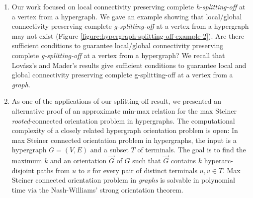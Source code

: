 \documentclass{article}
\newcommand{\knote}[1]{{\color{red}[{\tiny Karthik: \bf #1}]\marginpar{\color{red}*}}}
\begin{document}
\begin{enumerate}
    \item Our work focused on local connectivity preserving complete \emph{h-splitting-off} at a vertex from a hypergraph. We gave an example showing that local/global connectivity preserving complete \emph{g-splitting-off} at a vertex from a hypergraph may not exist (Figure \ref{figure:hypergraph-splitting-off-example-2}). 
    Are there sufficient conditions to guarantee local/global connectivity preserving complete \emph{g-splitting-off} at a vertex from a hypergraph? We recall that Lov\'{a}sz's \cite{Lov74, Lovasz-problems-book} and Mader's \cite{Mad78} results give sufficient conditions to guarantee local and global connectivity preserving complete g-splitting-off at a vertex from a \emph{graph}. 

    \item As one of the applications of our splitting-off result, we presented an alternative proof of an approximate min-max relation for the max Steiner \emph{rooted}-connected orientation problem in hypergraphs. The computational complexity of a closely related hypergraph orientation problem is open: In max Steiner connected orientation problem in hypergraphs, the input is a hypergraph $G=(V, E)$ and a subset $T$ of terminals. The goal is to find the maximum $k$ and an orientation $\overrightarrow{G}$ of $G$ such that $\overrightarrow{G}$ contains $k$ hyperarc-disjoint paths from $u$ to $v$ for every pair of distinct terminals $u, v\in T$. Max Steiner connected orientation problem in \emph{graphs} is solvable in polynomial time via the Nash-Williams' strong orientation theorem. 

\end{enumerate}
\end{document}

